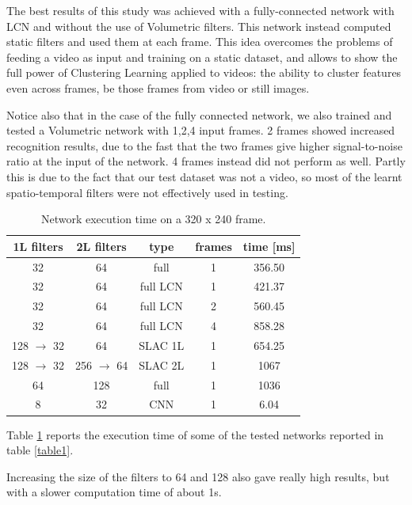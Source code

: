 \documentclass{article} %
\begin{document}
The best results of this study was achieved with a fully-connected network with LCN and without the use of Volumetric filters. This network instead computed static filters and used them at each frame. This idea overcomes the problems of feeding a video as input and training on a static dataset, and allows to show the full power of Clustering Learning applied to videos: the ability to cluster features even across frames, be those frames from video or still images.

Notice also that in the case of the fully connected network, we also trained and tested a Volumetric network with 1,2,4 input frames. 
2 frames showed increased recognition results, due to the fast that the two frames give higher signal-to-noise ratio at the input of the network. 4 frames instead did not perform as well. Partly this is due to the fact that our test dataset was not a video, so most of the learnt spatio-temporal filters were not effectively used in testing.

\begin{table}[htdp]
\caption{Network execution time on a 320 x 240 frame.}
\begin{center}
\begin{tabular}{|c|c|c|c|c|}
\hline\hline
1L filters	& 2L filters	& type				& frames 		&time [ms] \\ 
\hline
32 		& 64 			& full					& 1			& 356.50 \\
32 		& 64 			& full LCN				& 1			& 421.37 \\
32 		& 64 			& full	 LCN				& 2			& 560.45 \\
32 		& 64 			& full	 LCN				& 4			& 858.28 \\
128 $\rightarrow$ 32 	& 64 			& SLAC 1L			& 1			& 654.25 \\
128 $\rightarrow$ 32 	& 256 $\rightarrow$ 64 	& SLAC 2L			& 1			& 1067 \\	
64		& 128		& full					& 1			& 1036 \\
8		& 32			& CNN				& 1			& 6.04 \\

\hline\hline
\end{tabular}
\end{center}
\label{table2}
\end{table}

Table \ref{table2} reports the execution time of some of the tested networks reported in table \ref{table1}.

Increasing the size of the filters to 64 and 128 also gave really high results, but with a slower computation time of about 1s.
\end{document}
